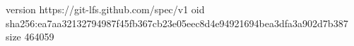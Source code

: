 version https://git-lfs.github.com/spec/v1
oid sha256:ea7aa32132794987f45fb367cb23e05eec8d4e94921694bea3dfa3a902d7b387
size 464059
